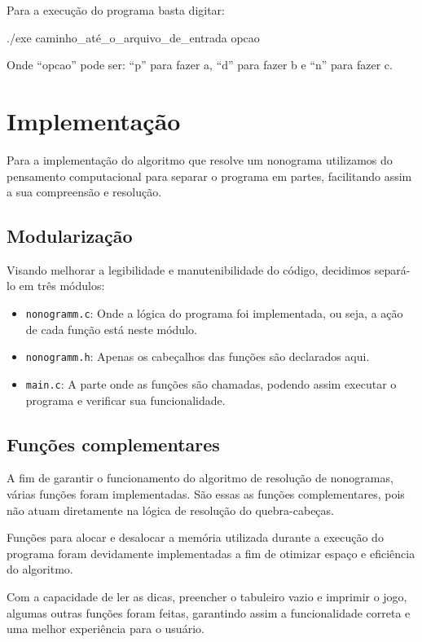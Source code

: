 \documentclass{article}
\begin{document}
Para a execução do programa basta digitar:
\begin{tcolorbox}[title=,width=\linewidth]
    ./exe caminho\_até\_o\_arquivo\_de\_entrada opcao
\end{tcolorbox}

Onde ``opcao'' pode ser: ``p'' para fazer a, ``d'' para fazer b e ``n'' para fazer c.


\section{Implementação}

Para a implementação do algoritmo que resolve um nonograma utilizamos do pensamento computacional para separar o programa em partes, facilitando assim a sua compreensão e resolução.

\subsection{Modularização}

Visando melhorar a legibilidade e manutenibilidade do código, decidimos separá-lo em três módulos:

\begin{itemize}
    \item \texttt{nonogramm.c}: Onde a lógica do programa foi implementada, ou seja, a ação de cada função está neste módulo.
    \item \texttt{nonogramm.h}: Apenas os cabeçalhos das funções são declarados aqui.
    \item \texttt{main.c}: A parte onde as funções são chamadas, podendo assim executar o programa e verificar sua funcionalidade.
\end{itemize}

\subsection{Funções complementares}

A fim de garantir o funcionamento do algoritmo de resolução de nonogramas, várias funções foram implementadas. São essas as funções complementares, pois não atuam diretamente na lógica de resolução do quebra-cabeças.

Funções para alocar e desalocar a memória utilizada durante a execução do programa foram devidamente implementadas a fim de otimizar espaço e eficiência do algoritmo.

Com a capacidade de ler as dicas, preencher o tabuleiro vazio e imprimir o jogo, algumas outras funções foram feitas, garantindo assim a funcionalidade correta e uma melhor experiência para o usuário.
\end{document}
